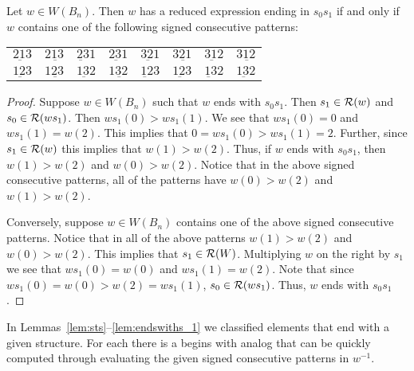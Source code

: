 \begin{proposition}\label{lem:endswiths_1}
Let $w \in W(B_n)$. Then $w$ has a reduced expression ending in $s_0s_1$ if and only if $w$ contains one of the following signed consecutive patterns:
\begin{center}
\begin{tabular}{llllllll}
$2 \underbar{1} 3$ & $ 2 \underbar{13}$ & $ \underbar{23}1$  & $ \underbar{231}$  & $3\underbar{2}1 $ & $ 3 \underbar{21}$ & $ 3 \underbar{1}2$ & $ 3\underbar{12}$ \\
$ 1 \underbar{2}3$ & $ 1 \underbar{23}$ & $ 1 \underbar{3}2$ & $ 1 \underbar{32}$ & $ \underbar{12}3$ & $ \underbar{123}$  & $ \underbar{13}2$  & $ \underbar{132}$
\end{tabular}
\end{center}
\begin{proof}
	Suppose $w \in W(B_n)$ such that $w$ ends with $s_0s_1$. Then $s_1 \in \mathcal{R}(w)$ and $s_0 \in \mathcal{R}(ws_1)$. Then $ws_1(0)>ws_1(1)$. We see that $ws_1(0)=0$ and $ws_1(1)=w(2)$. This implies that $0=ws_1(0)>ws_1(1)=2$. Further, since $s_1 \in \mathcal{R}(w)$ this implies that $w(1) > w(2)$. Thus, if $w$ ends with $s_0s_1$, then $w(1)>w(2)$ and $w(0)>w(2)$. Notice that in the above signed consecutive patterns, all of the patterns have $w(0)>w(2)$ and $w(1)>w(2)$.
	
	Conversely, suppose $w \in W(B_n)$ contains one of the above signed consecutive patterns. Notice that in all of the above patterns $w(1)>w(2)$ and $w(0)>w(2)$. This implies that $s_1 \in \mathcal{R}(W)$. Multiplying $w$ on the right by $s_1$ we see that $ws_1(0)=w(0)$ and $ws_1(1)=w(2)$. Note that since $ws_1(0)=w(0)>w(2)=ws_1(1)$, $s_0 \in \mathcal{R}(ws_1)$. Thus, $w$ ends with $s_0s_1$. 
\end{proof}	
\end{proposition}

\begin{remark}
In Lemmas~\ref{lem:sts}--\ref{lem:endswiths_1} we classified elements that end with a given structure. For each there is a begins with analog that can be quickly computed through evaluating the given signed consecutive patterns in $w^{-1}$.
\end{remark}


